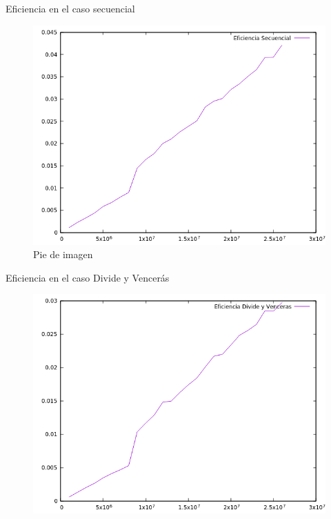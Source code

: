 \documentclass[12pt]{beamer}
\begin{document}
\begin{frame}{Eficiencia en el caso secuencial}

\begin{figure}[H] 
\centering
\includegraphics[angle=0,scale=0.4]{img/Eficiencia_sec.png} 
\caption{Pie de imagen} 
\label{etiqueta} 
\end{figure}

\end{frame}

\begin{frame}{Eficiencia en el caso Divide y Vencerás}

\begin{figure}[H] 
\centering
\includegraphics[angle=0,scale=0.5]{img/Eficiencia_dyv.png} 
\label{etiqueta} 
\end{figure}

\end{frame}
\end{document}
